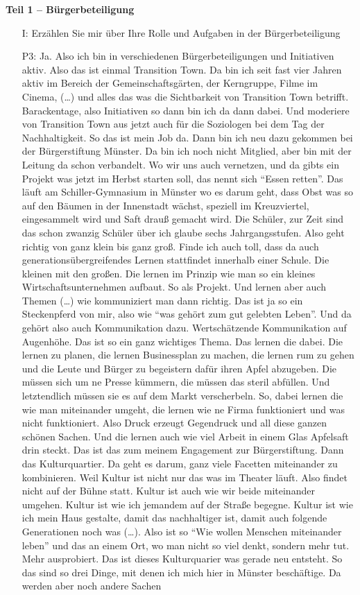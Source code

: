 \textbf{Teil 1 -- B{\"u}rgerbeteiligung}
\begin{itemize}
    \item[I:] Erz{\"a}hlen Sie mir {\"u}ber Ihre Rolle und Aufgaben in der B{\"u}rgerbeteiligung
    \item[P3:] Ja. Also ich bin in verschiedenen B{\"u}rgerbeteiligungen und Initiativen aktiv. Also das ist einmal Transition Town. Da bin ich seit fast vier Jahren aktiv im Bereich der Gemeinschaftsg{\"a}rten, der Kerngruppe, Filme im Cinema, (\dots) und alles das was die Sichtbarkeit von Transition Town betrifft. Barackentage, also Initiativen so dann bin ich da dann dabei. Und moderiere von Transition Town aus jetzt auch f{\"u}r die Soziologen bei dem Tag der Nachhaltigkeit. So das ist mein Job da. Dann bin ich neu dazu gekommen bei der B{\"u}rgerstiftung M{\"u}nster. Da bin ich noch nicht Mitglied, aber bin mit der Leitung da schon verbandelt. Wo wir uns auch vernetzen, und da gibts ein Projekt was jetzt im Herbst starten soll, das nennt sich "`Essen retten"'. Das l{\"a}uft am Schiller-Gymnasium in M{\"u}nster wo es darum geht, dass Obst was so auf den B{\"a}umen in der Innenstadt w{\"a}chst, speziell im Kreuzviertel, eingesammelt wird und Saft drau{\ss} gemacht wird. Die Sch{\"u}ler, zur Zeit sind das schon zwanzig Sch{\"u}ler {\"u}ber ich glaube sechs Jahrgangsstufen. Also geht richtig von ganz klein bis ganz gro{\ss}. Finde ich auch toll, dass da auch generations{\"u}bergreifendes Lernen stattfindet innerhalb einer Schule. Die kleinen mit den gro{\ss}en. Die lernen im Prinzip wie man so ein kleines Wirtschaftsunternehmen aufbaut. So als Projekt. Und lernen aber auch Themen (\dots) wie kommuniziert man dann richtig. Das ist ja so ein Steckenpferd von mir, also wie "`was geh{\"o}rt zum gut gelebten Leben"'. Und da geh{\"o}rt also auch Kommunikation dazu. Wertsch{\"a}tzende Kommunikation auf Augenh{\"o}he. Das ist so ein ganz wichtiges Thema. Das lernen die dabei. Die lernen zu planen, die lernen Businessplan zu machen, die lernen rum zu gehen und die Leute und B{\"u}rger zu begeistern daf{\"u}r ihren Apfel abzugeben. Die m{\"u}ssen sich um ne Presse k{\"u}mmern, die m{\"u}ssen das steril abf{\"u}llen. Und letztendlich m{\"u}ssen sie es auf dem Markt verscherbeln. So, dabei lernen die wie man miteinander umgeht, die lernen wie ne Firma funktioniert und was nicht funktioniert. Also Druck erzeugt Gegendruck und all diese ganzen sch{\"o}nen Sachen. Und die lernen auch wie viel Arbeit in einem Glas Apfelsaft drin steckt. Das ist das zum meinem Engagement zur B{\"u}rgerstiftung. Dann das Kulturquartier. Da geht es darum, ganz viele Facetten miteinander zu kombinieren. Weil Kultur ist nicht nur das was im Theater l{\"a}uft. Also findet nicht auf der B{\"u}hne statt. Kultur ist auch wie wir beide miteinander umgehen. Kultur ist wie ich jemandem auf der Stra{\ss}e begegne. Kultur ist wie ich mein Haus gestalte, damit das nachhaltiger ist, damit auch folgende Generationen noch was (\dots). Also ist so "`Wie wollen Menschen miteinander leben"' und das an einem Ort, wo man nicht so viel denkt, sondern mehr tut. Mehr ausprobiert. Das ist dieses Kulturquarier was gerade neu entsteht. So das sind so drei Dinge, mit denen ich mich hier in M{\"u}nster besch{\"a}ftige. Da werden aber noch andere Sachen 
\end{itemize}
